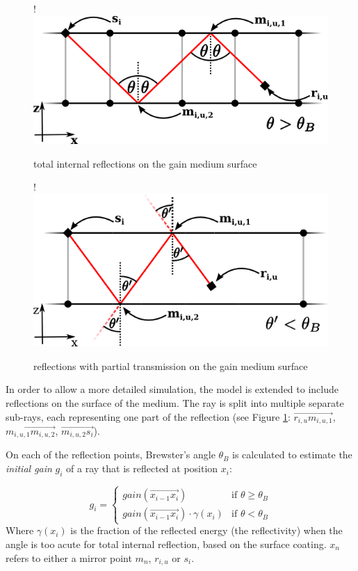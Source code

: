 \begin{figure}[H]
  \centerline{
     {!} {\includegraphics{./graphics/reflections_2.png}}
  }
  \caption{total internal reflections on the gain medium surface}
  \label{graphic:reflections_2D}
\end{figure}
\begin{figure}[H]
  \centerline{
     {!} {\includegraphics{./graphics/transmission1.png}}
  }
  \caption{reflections with partial transmission on the gain medium surface}
  \label{graphic:transmission_2D}
\end{figure}
In order to allow a more detailed simulation, the model is extended to include
reflections on the surface of the medium. The ray is split into multiple
separate sub-rays, each representing one part of the reflection (see Figure
\ref{graphic:reflections_2D}: $\overrightarrow{r_{i,u}m_{i,u,1}}$,
$\overrightarrow{m_{i,u,1}m_{i,u,2}}$, $\overrightarrow{m_{i,u,2}s_i}$).

On each of the reflection points, Brewster's angle $\theta_{B}$ is calculated to
estimate the \emph{initial gain} $g_i$ of a ray that is reflected at position
$x_i$:

\begin{equation}
\label{eq:gain_reflection}
  g_i = 
  \begin{cases}
    gain(\overrightarrow{x_{i-1}x_i}) & \text{if } \theta \ge \theta_{B}  \\
    gain(\overrightarrow{x_{i-1}x_i}) \cdot \gamma(x_i) & \text{if } \theta < \theta_{B}   
  \end{cases}
\end{equation}
Where $\gamma(x_i)$ is the fraction of the reflected energy (the reflectivity)
when the angle is too acute for total internal reflection, based on the surface
coating. $x_n$ refers to
either a mirror point $m_n$, $r_{i,u}$ or $s_i$.

